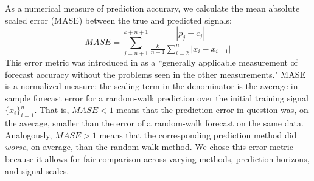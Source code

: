As a numerical measure of prediction accurary, we calculate the mean
absolute scaled error (MASE) between the true and predicted signals:
% 
$$MASE = \sum_{j=n+1}^{k+n+1}\frac{|p_j-c_j|
}{\frac{k}{n-1}\sum^n_{i=2}|x_{i}-x_{i-1}|}$$
% 
This error metric was introduced in \cite{MASE} as a ``generally
applicable measurement of forecast accuracy without the problems seen
in the other measurements."  MASE is a normalized measure: the scaling
term in the denominator
% 
% 
is the average in-sample forecast error for a random-walk prediction
over the initial training signal $\{x_i\}^n_{i=1}$.  That is, $MASE<1$ means that the
prediction error in question was, on the average, smaller than the
error of a random-walk forecast on the same data.  Analogously,
$MASE>1$ means that the corresponding prediction method did
\emph{worse}, on average, than the random-walk method.  We chose this
error metric because it allows for fair comparison across varying
methods, prediction horizons, and signal scales.

